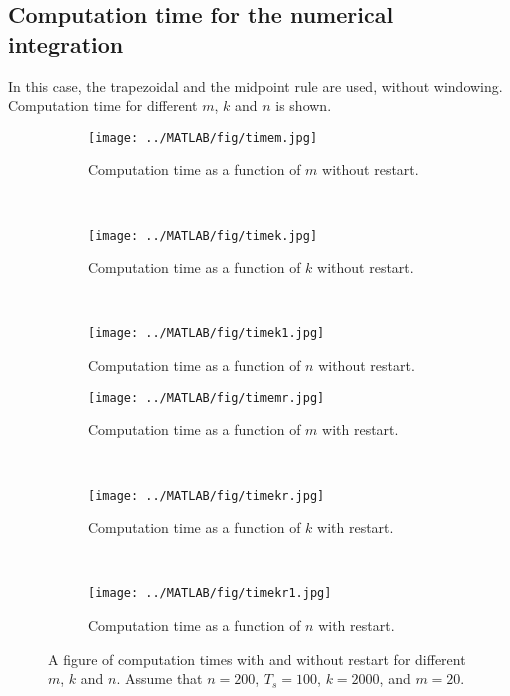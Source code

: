 \subsection{Computation time for the numerical integration} \label{sec:naive}
In this case, the trapezoidal and the midpoint rule are used, without windowing. Computation time for different $m$, $k$ and $n$ is shown.
\begin{figure}[H]
        \centering
        \begin{subfigure}[b]{0.3\textwidth}
                \texttt{[image: ../MATLAB/fig/timem.jpg]}
                \caption{ Computation time as a function of $m$ without restart. }
                \label{fig:timem}
        \end{subfigure}
        ~
        \begin{subfigure}[b]{0.3\textwidth}
                \texttt{[image: ../MATLAB/fig/timek.jpg]}
                \caption{ Computation time as a function of $k$ without restart. }
                \label{fig:timek}
        \end{subfigure}
        ~
        \begin{subfigure}[b]{0.3\textwidth}
                \texttt{[image: ../MATLAB/fig/timek1.jpg]}
                \caption{ Computation time as a function of $n$ without restart. }
                \label{fig:timek1}
        \end{subfigure}
        
        \begin{subfigure}[b]{0.3\textwidth}
                \texttt{[image: ../MATLAB/fig/timemr.jpg]}
                \caption{ Computation time as a function of $m$ with restart. }
                \label{fig:timemr}
        \end{subfigure}
        ~
        \begin{subfigure}[b]{0.3\textwidth}
                \texttt{[image: ../MATLAB/fig/timekr.jpg]}
                \caption{ Computation time as a function of $k$ with restart. }
                \label{fig:timekr}
        \end{subfigure}
        ~
        \begin{subfigure}[b]{0.3\textwidth}
                \texttt{[image: ../MATLAB/fig/timekr1.jpg]}
                \caption{ Computation time as a function of $n$ with restart. }
                \label{fig:timekr1}
        \end{subfigure}          
        
        \caption{ A figure of computation times with and without restart for different $m$, $k$ and $n$. Assume that $n = 200$, $T_s = 100$, $k = 2000$, and $m = 20$. }
        \label{fig:time0}
\end{figure}
